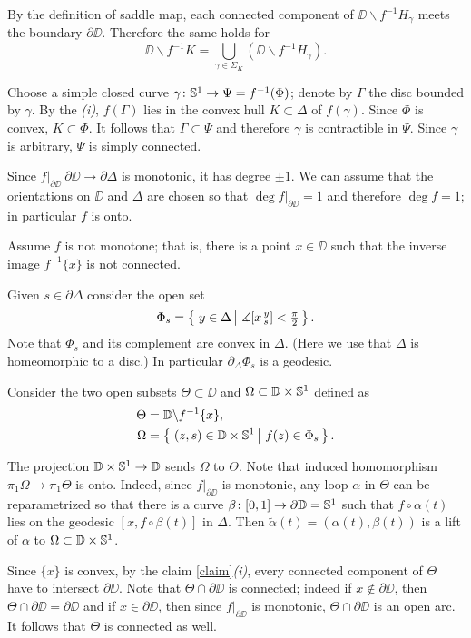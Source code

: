 \documentclass{article}
\begin{document}
By the definition of saddle map, each connected component of $\DD\backslash f^{-1}H_\gamma$ meets the boundary $\partial \DD$.
Therefore the same holds for 
\[\DD\backslash f^{-1}K=\bigcup_{\gamma\in\Sigma_K}(\DD\backslash f^{-1}H_\gamma).\]

Choose a simple closed curve $\gamma\colon\mathbb{S}^1\to\Psi=f^{-1}(\Phi)$;
denote by $\Gamma$ the disc bounded by $\gamma$.
By the \textit{(i)}, $f(\Gamma)$ lies in the convex hull $K\subset \Delta$ of $f(\gamma)$.
Since $\Phi$ is convex,  $K\subset \Phi$.
It follows that $\Gamma\subset\Psi$ and therefore $\gamma$ is contractible in $\Psi$.
Since $\gamma$ is arbitrary, $\Psi$ is simply connected.
\qeds

Since $f|_{\partial\DD}\:\partial\DD \to\partial \Delta$ is monotonic, it has degree $\pm1$.
We can assume that the orientations on $\DD$ and $\Delta$ are chosen so that $\deg f|_{\partial\DD}=1$
and therefore $\deg f=1$;
in particular $f$ is onto.

Assume $f$ is not monotone;
that is, there is a point $x\in \DD$ such that the inverse image $f^{-1}\{x\}$ is not connected.

Given $s\in\partial \Delta$ consider the open set
\[\Phi_s=\set{y\in\Delta}{\measuredangle [x\,^y_s]<\tfrac\pi2}.\]
Note that $\Phi_s$ and its complement are convex in $\Delta$.
(Here we use that $\Delta$ is homeomorphic to a disc.)
In particular $\partial_\Delta\Phi_s$ is a geodesic.

Consider the two open subsets $\Theta\subset \DD$ and $\Omega\subset  \mathbb{D}\times\mathbb{S}^1$ defined as
\begin{align*}
\Theta&=\DD\backslash f^{-1}\{x\},
\\
\Omega&=\set{(z,s)\in \DD\times\SS^1}{f(z)\in \Phi_s}.
\end{align*}

The  projection $\mathbb{D}\times\mathbb{S}^1\to \mathbb{D}$ sends $\Omega$ to $\Theta$.
Note that induced homomorphism $\pi_1\Omega\to \pi_1\Theta$ is onto.
Indeed, since $f|_{\partial\DD}$ is monotonic, any loop $\alpha$ in $\Theta$ can be reparametrized so that there is a curve $\beta\colon[0,1]\to \partial\mathbb{D}=\mathbb{S}^1$ such that 
$f\circ\alpha(t)$ lies on the geodesic $[x,f\circ\beta(t)]$ in $\Delta$.
Then $\tilde\alpha(t)=(\alpha(t),\beta(t))$ is a lift of $\alpha$ to $\Omega\subset\mathbb{D}\times\mathbb{S}^1$.

Since $\{x\}$ is convex, by the claim \ref{claim}\textit{(i)}, every connected component of $\Theta$ have to intersect $\partial\DD$.
Note that $\Theta\cap \partial\DD$ is connected;
indeed if $x\notin \partial\DD$, then $\Theta\cap \partial\DD=\partial \DD$
and if $x\in \partial\DD$, then since $f|_{\partial\DD}$ is monotonic, $\Theta\cap \partial\DD$ is an open arc.
It follows that $\Theta$ is connected as well.
\end{document}
